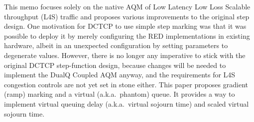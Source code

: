 This memo focuses solely on the native AQM of Low Latency Low Loss Scalable throughput (L4S) traffic and proposes various improvements to the original step design. One motivation for DCTCP to use simple step marking was that it was possible to deploy it by merely configuring the RED implementations in existing hardware, albeit in an unexpected configuration by setting parameters to degenerate values. However, there is no longer any imperative to stick with the original DCTCP step-function design, because changes will be needed to implement the DualQ Coupled AQM anyway, and the requirements for L4S congestion controls are not yet set in stone either. This paper proposes gradient (ramp) marking and a virtual (a.k.a.\ phantom) queue. It provides a way to implement virtual queuing delay (a.k.a.\ virtual sojourn time) and scaled virtual sojourn time.